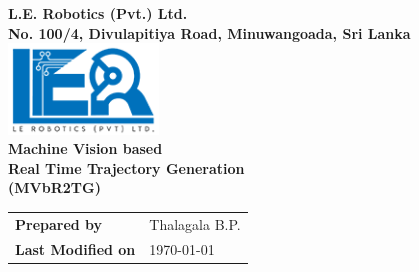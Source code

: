 \begin{titlepage}
\center %

\textbf{\Large L.E. Robotics (Pvt.) Ltd.}\\[0.5cm]
\textbf{\large No. 100/4, Divulapitiya Road, Minuwangoada,	Sri Lanka}\\[3cm]

\includegraphics[width=0.3\textwidth]{figures/logoler}\\[3cm]

	
\textbf{\Huge Machine Vision based\\ Real Time Trajectory Generation\\ (MVbR2TG)}\\[6cm]






\begin{tabular}[!h]{ l l}
\textbf{\large Prepared by} & {\large Thalagala B.P.}\\
\textbf{\large Last Modified on}&  {\large \today}
\end{tabular}

%



\end{titlepage}